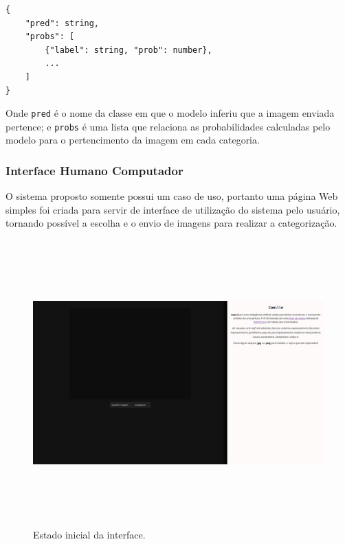 \documentclass[12pt, a4paper]{article}
\begin{document}
\begin{lstlisting}
{
	"pred": string, 
	"probs": [
		{"label": string, "prob": number}, 
		...
	]
}
\end{lstlisting}

Onde \lstinline{pred} é o nome da classe em que o modelo inferiu que a imagem enviada pertence; e \lstinline{probs} é uma lista que relaciona as probabilidades calculadas pelo modelo para o pertencimento da imagem em cada categoria.

\subsubsection{Interface Humano Computador}
O sistema proposto somente possui um caso de uso, portanto uma página Web simples foi criada para servir de interface de utilização do sistema pelo usuário, tornando possível a escolha e o envio de imagens para realizar a categorização.

\begin{figure}[H]
	\centering
	\includegraphics[width=\textwidth, height=11cm, keepaspectratio=true]{fig/site_noimg}
	\caption{Estado inicial da interface.}
\end{figure}
\end{document}
